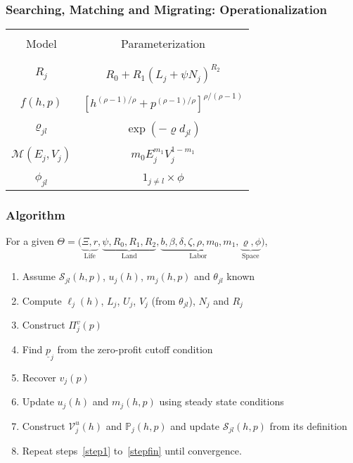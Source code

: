 \documentclass{beamer}
\newcommand{\1}{\mathbb{1}}
\newcommand{\V}{\mathcal{V}}
\newcommand{\Su}{\mathcal{S}}
\newcommand{\up}{\underline{p}}
\begin{document}
\begin{frame}\frametitle{Searching, Matching and Migrating: Operationalization}
\begin{center}
\begin{tabular}{|cc|}
\hline\label{tab:func}
&\\[-2ex]
Model & Parameterization\\
&\\[-2ex]
\hline
&\\[-2ex]
$R_j$ & $ R_0 + R_1 (L_j+\psi N_j)^{R_2}$ \\
&\\[-2ex]
$f(h,p)$& $[h^{(\rho-1)/\rho}+p^{(\rho-1)/\rho}]^{\rho/(\rho-1)}$\\
&\\[-2ex]
$\varrho_{jl}$ &$\exp(-\varrho d_{jl})$\\
&\\[-2ex]
$\mathcal{M}(E_j,V_j)$ & $m_0 E_j^{m_1} V_j^{1-m_1}$ \\
&\\[-2ex]
$\phi_{jl}$ & $1_{j\neq l} \times\phi$\\
\hline
\end{tabular}
\end{center}
\end{frame}

\begin{frame}
\frametitle{Algorithm}
For a given $\Theta=\big(\underbrace{\Xi,r}_{\text{Life}},\underbrace{\psi,R_0,R_1,R_2}_{\text{Land}},\underbrace{b,\beta,\delta,\zeta,\rho,m_0,m_1}_{\text{Labor}},\underbrace{\varrho,\phi}_{\text{Space}}\big)$,\medskip
\begin{enumerate}
\item Assume $\Su_{jl}(h,p)$, $u_j(h)$, $m_j(h,p)$ and $\theta_{jl}$ known
\item Compute $\ell_j(h)$, $L_j$, $U_j$, $V_j$ (from $\theta_{jl}$), $N_j$ and $R_j$
\item Construct $\Pi_j^v(p)$\label{step1}
\item Find $\up_j$ from the zero-profit cutoff condition
\item Recover $v_j(p)$
\item Update $u_j(h)$ and $m_j(h,p)$ using steady state conditions
\item Construct $\V^u_j(h)$ and $\mathbb{P}_j(h,p)$ and update $\Su_{jl}(h,p)$ from its definition\label{stepfin}
\item Repeat steps~\ref{step1} to~\ref{stepfin} until convergence.
\end{enumerate}
\end{frame}
\end{document}

